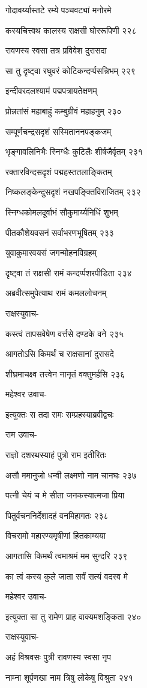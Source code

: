 गोदावर्य्यास्तटे रम्ये पञ्चवट्यां मनोरमे

कस्यचित्त्वथ कालस्य राक्षसी घोररूपिणी २२८

रावणस्य स्वसा तत्र प्रविवेश दुरासदा

सा तु दृष्ट्वा रघुवरं कोटिकन्दर्प्पसन्निभम् २२९

इन्दीवरदलश्यामं पद्मपत्रायतेक्षणम्

प्रोन्नतांसं महाबाहुं कम्बुग्रीवं महाहनुम् २३०

सम्पूर्णचन्द्रसदृशं सस्मिताननपङ्कजम्

भृङ्गावलिनिभैः स्निग्धैः कुटिलैः शीर्षजैर्वृतम् २३१

रक्तारविन्दसदृशं पद्महस्ततलाङ्कितम्

निष्कलङ्केन्दुसदृशं नखपङ्क्तिविराजितम् २३२

स्निग्धकोमलदूर्वाभं सौकुमार्य्यनिधिं शुभम्

पीतकौशेयवसनं सर्वाभरणभूषितम् २३३

युवाकुमारवयसं जगन्मोहनविग्रहम्

दृष्ट्वा तं राक्षसी रामं कन्दर्प्पशरपीडिता २३४

अब्रवीत्समुपेत्याथ रामं कमललोचनम्

राक्षस्युवाच-

कस्त्वं तापसवेषेण वर्त्तसे दण्डके वने २३५

आगतोऽसि किमर्थं च राक्षसानां दुरासदे

शीघ्रमाचक्ष्व तत्त्वेन नानृतं वक्तुमर्हसि २३६

महेश्वर उवाच-

इत्युक्तः स तदा रामः सम्प्रहस्याब्रवीद्वचः

राम उवाच-

राज्ञो दशरथस्याहं पुत्रो राम इतीरितः

असौ ममानुजो धन्वी लक्ष्मणो नाम चानघः २३७

पत्नी चेयं च मे सीता जनकस्यात्मजा प्रिया

पितुर्वचननिर्देशादहं वनमिहागतः २३८

विचरामो महारण्यमृषीणां हितकाम्यया

आगतासि किमर्थं त्वमाश्रमं मम सुन्दरि २३९

का त्वं कस्य कुले जाता सर्वं सत्यं वदस्व मे

महेश्वर उवाच-

इत्युक्ता सा तु रामेण प्राह वाक्यमशङ्किता २४०

राक्षस्युवाच-

अहं विश्रवसः पुत्री रावणस्य स्वसा नृप

नाम्ना शूर्पणखा नाम त्रिषु लोकेषु विश्रुता २४१

